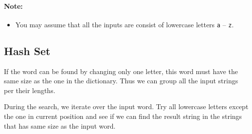 \paragraph{Note:}

\begin{itemize}
\item  You may assume that all the inputs are consist of lowercase letters \texttt{a} -- \texttt{z}.
\end{itemize}

\subsection{Hash Set}
If the word can be found by changing only one letter, this word must have the same size as the one in the dictionary. Thus we can group all the input strings per their lengths.

During the search, we iterate over the input word. Try all lowercase letters except the one in current position and see if we can find the result string in the strings that has same size as the input word.

